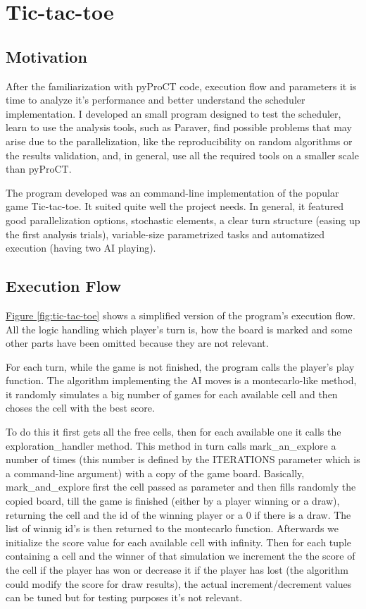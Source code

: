 \chapter{Tic-tac-toe}
\label{chap:ttt}

\section{Motivation}

After the familiarization with pyProCT code, execution flow and parameters it is time to analyze it's performance and better understand the scheduler implementation. I developed an small program designed to test the scheduler, learn to use the analysis tools, such as Paraver, find possible problems that may arise due to the parallelization, like the reproducibility on random algorithms or the results validation, and, in general, use all the required tools on a smaller scale than pyProCT. 

The program developed was an command-line implementation of the popular game Tic-tac-toe. It suited quite well the project needs. In general, it featured good parallelization options, stochastic elements, a clear turn structure (easing up the first analysis trials), variable-size parametrized tasks and automatized execution (having two AI playing).

\section{Execution Flow}

\hyperref[fig:tic-tac-toe]{Figure \ref{fig:tic-tac-toe}} shows a simplified version of the program's execution flow. All the logic handling which player's turn is, how the board is marked and some other parts have been omitted because they are not relevant. 

For each turn, while the game is not finished, the program calls the player's play function. The algorithm implementing the AI moves is a montecarlo-like method, it randomly simulates a big number of games for each available cell and then choses the cell with the best score.

To do this it first gets all the free cells, then for each available one it calls the exploration\_handler method. This method in turn calls mark\_an\_explore a number of times (this number is defined by the ITERATIONS parameter which is a command-line argument) with a copy of the game board. Basically, mark\_and\_explore first the cell passed as parameter and then fills randomly the copied board, till the game is finished (either by a player winning or a draw), returning the cell and the id of the winning player or a 0 if there is a draw. The list of winnig id's is then returned to the montecarlo function. Afterwards we initialize the score value for each available cell with infinity. Then for each tuple containing a cell and the winner of that simulation we increment the the score of the cell if the player has won or decrease it if the player has lost (the algorithm could modify the score for draw results), the actual increment/decrement values can be tuned but for testing purposes it's not relevant. 

